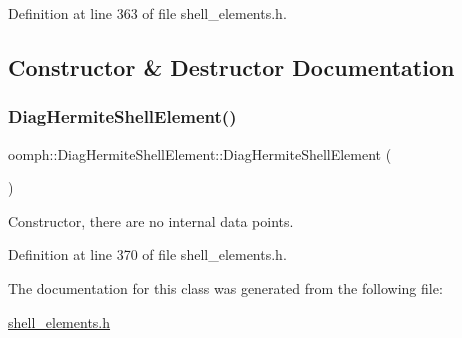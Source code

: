 Definition at line 363 of file shell\+\_\+elements.\+h.



\subsection{Constructor \& Destructor Documentation}
\mbox{\label{classoomph_1_1DiagHermiteShellElement_afbc92280d72ec2f840d76014ed623d1b}} 
\subsubsection{\texorpdfstring{Diag\+Hermite\+Shell\+Element()}{DiagHermiteShellElement()}}
{\footnotesize\ttfamily oomph\+::\+Diag\+Hermite\+Shell\+Element\+::\+Diag\+Hermite\+Shell\+Element (\begin{DoxyParamCaption}{ }\end{DoxyParamCaption})\hspace{0.3cm}{\ttfamily [inline]}}



Constructor, there are no internal data points. 



Definition at line 370 of file shell\+\_\+elements.\+h.



The documentation for this class was generated from the following file\+:\begin{DoxyCompactItemize}
\item 
\hyperlink{shell__elements_8h}{shell\+\_\+elements.\+h}\end{DoxyCompactItemize}
